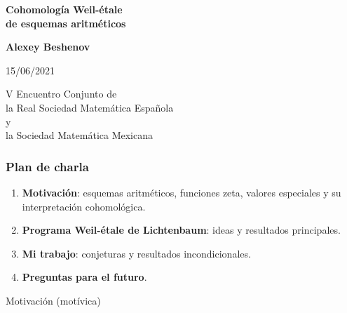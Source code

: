 \documentclass[handout]{beamer}
\begin{document}

\begin{frame}[noframenumbering]
  \begin{center}
    {\LARGE\bf Cohomología Weil-étale\\
      de esquemas aritméticos

    }

    \vspace{3em}

    {\large\bf Alexey Beshenov}

    \vspace{3em}

    15/06/2021

    \vspace{1em}

    V Encuentro Conjunto de\\
    la Real Sociedad Matemática Española \\
    y\\
    la Sociedad Matemática Mexicana

  \end{center}
\end{frame}


\begin{frame}
  \frametitle{Plan de charla}

  \begin{enumerate}
  \item<2-> \textbf{Motivación}:
    esquemas aritméticos,
    funciones zeta,
    valores especiales
    y su interpretación cohomológica.

  \item<3-> \textbf{Programa Weil-étale de Lichtenbaum}:
    ideas y resultados principales.

  \item<4-> \textbf{Mi trabajo}:
    conjeturas y resultados incondicionales.

  \item<5-> \textbf{Preguntas para el futuro}.
  \end{enumerate}
\end{frame}


\begin{frame}[plain]
  \headingfont

  \begin{center}
    {\huge Motivación (motívica)}
  \end{center}
\end{frame}
\end{document}
